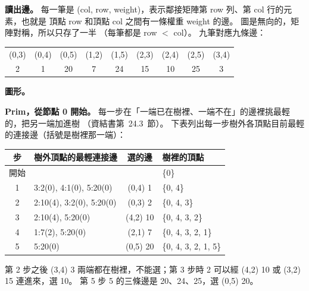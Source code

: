 \begin{pastsoln}
\textbf{讀出邊。} 每一筆是 (col, row, weight)，表示鄰接矩陣第 row 列、第 col 行的元素，也就是
頂點 row 和頂點 col 之間有一條權重 weight 的邊。 圖是無向的，矩陣對稱，所以只存了一半
（每筆都是 row $<$ col）。 九筆對應九條邊：
\begin{center}
\begin{tabular}{ccccccccc}
\toprule
(0,3) & (0,4) & (0,5) & (1,2) & (1,5) & (2,3) & (2,4) & (2,5) & (3,4) \\
2 & 1 & 20 & 7 & 24 & 15 & 10 & 25 & 3 \\
\bottomrule
\end{tabular}
\end{center}

\textbf{圖形。}
\begin{center}
\end{center}

\textbf{Prim，從節點 0 開始。} 每一步在「一端已在樹裡、一端不在」的邊裡挑最輕的，把另一端加進樹
（資結書第~24.3~節）。 下表列出每一步樹外各頂點目前最輕的連接邊（括號是樹裡那一端）：
\begin{center}
\begin{tabular}{clcl}
\toprule
步 & 樹外頂點的最輕連接邊 & 選的邊 & 樹裡的頂點 \\
\midrule
開始 & & & \{0\} \\
1 & 3:2(0), 4:1(0), 5:20(0) & (0,4) 1 & \{0, 4\} \\
2 & 2:10(4), 3:2(0), 5:20(0) & (0,3) 2 & \{0, 4, 3\} \\
3 & 2:10(4), 5:20(0) & (4,2) 10 & \{0, 4, 3, 2\} \\
4 & 1:7(2), 5:20(0) & (2,1) 7 & \{0, 4, 3, 2, 1\} \\
5 & 5:20(0) & (0,5) 20 & \{0, 4, 3, 2, 1, 5\} \\
\bottomrule
\end{tabular}
\end{center}
第 2 步之後 (3,4) 3 兩端都在樹裡，不能選；第 3 步時 2 可以經 (4,2) 10 或 (3,2) 15 連進來，選 10。
第 5 步 5 的三條邊是 20、24、25，選 (0,5) 20。


\end{pastsoln}
